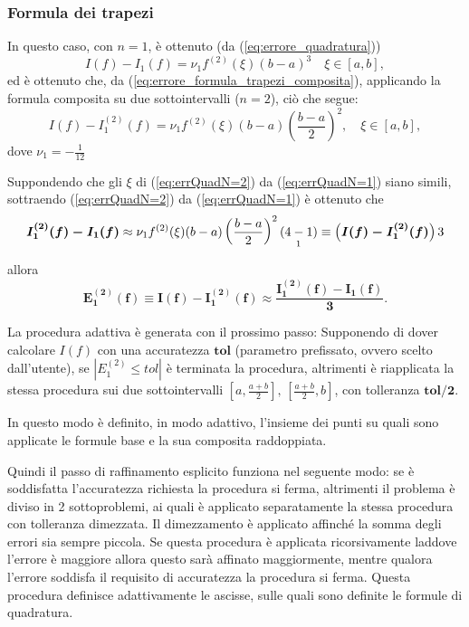 \subsubsection{Formula dei trapezi}
In questo caso, con $n=1$, è ottenuto (da (\ref{eq:errore_quadratura}))
\begin{equation}\label{eq:errQuadN=1}
    I(f)-I_1(f)=\nu_1 f^{(2)}(\xi)(b-a)^3\quad \xi\in[a,b],
\end{equation}
ed è ottenuto che, da (\ref{eq:errore_formula_trapezi_composita}), applicando la formula composita su due sottointervalli ($n=2$), ciò che segue:\begin{equation}\label{eq:errQuadN=2}
    I(f)-I_1^{(2)}(f)=\nu_1 f^{(2)}(\xi)(b-a)\left(\frac{b-a}{2}\right)^2,\quad \xi\in [a,b],
\end{equation}
dove $\nu_1=-\frac{1}{12}$

Suppondendo che gli $\xi$ di (\ref{eq:errQuadN=2}) da (\ref{eq:errQuadN=1}) siano simili, sottraendo (\ref{eq:errQuadN=2}) da (\ref{eq:errQuadN=1}) è ottenuto che
\begin{equation*}
    \boldsymbol{I_1^{(2)}(f)-I_1(f)}\approx\nu_1 f^{(2)}(\xi)(b-a)\left(\frac{b-a}{2}\right)^2\underset{\footnotemark}{(4-1)}\equiv \left(\boldsymbol{I(f)-I_1^{(2)}(f)}\right) 3
\end{equation*}
allora
\begin{equation*}
    \boldsymbol{E_1^{(2)}(f)\equiv I(f)-I_1^{(2)}(f)\approx\frac{I_1^{(2)}(f)-I_1(f)}{3}}.
\end{equation*}


La procedura adattiva è generata con il prossimo passo: Supponendo di dover calcolare $I(f)$ con una accuratezza $\boldsymbol{tol}$ (parametro prefissato, ovvero scelto dall'utente), se $\left|E_1^{(2)}\leq tol\right|$ è terminata la procedura, altrimenti è riapplicata la stessa procedura sui due sottointervalli $\left[a,\frac{a+b}{2}\right],\, \left[\frac{a+b}{2},b\right]$, con tolleranza $\boldsymbol{tol/2}$.

In questo modo è definito, in modo adattivo, l'insieme dei punti su quali sono applicate le formule base e la sua composita raddoppiata.

Quindi il passo di raffinamento esplicito funziona nel seguente modo: se è soddisfatta l'accuratezza richiesta la procedura si ferma, altrimenti il problema è diviso in 2 sottoproblemi, ai quali è applicato separatamente la stessa procedura con tolleranza dimezzata. Il dimezzamento è applicato affinché la somma degli errori sia sempre piccola. Se questa procedura è applicata ricorsivamente laddove l'errore è maggiore allora questo sarà affinato maggiormente, mentre qualora l'errore soddisfa il requisito di accuratezza la procedura si ferma. Questa procedura definisce adattivamente le ascisse, sulle quali sono definite le formule di quadratura.

